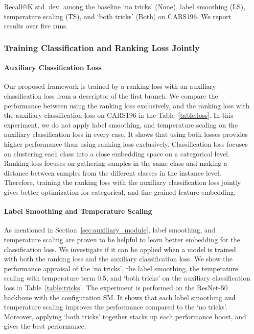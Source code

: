 \documentclass[10pt,twocolumn,letterpaper]{article}
\begin{document}
\begin{CJK}{UTF8}{mj}
\begin{table}[t!]
\begin{center}
\end{center}
\caption{Recall@K  std. dev. among the baseline `no tricks' (None), label smoothing (LS), temperature scaling (TS), and `both tricks' (Both) on CARS196.
We report results over five runs.}
\label{table:tricks}
\end{table}

\subsubsection{Training Classification and Ranking Loss Jointly}


\paragraph{Auxiliary Classification Loss} \label{sec:ranking_loss_and_classification_loss}
Our proposed framework is trained by a ranking loss with an auxiliary classification loss from a descriptor of the first branch.
We compare the performance between using the ranking loss exclusively, and the ranking loss with the auxiliary classification loss on CARS196 in the Table~\ref{table:loss}.
In this experiment, we do not apply label smoothing, and temperature scaling on the auxiliary classification loss in every case.
It shows that using both losses provides higher performance than using ranking loss exclusively.
Classification loss focuses on clustering each class into a close embedding space on a categorical level.
Ranking loss focuses on gathering samples in the same class and making a distance between samples from the different classes in the instance level.
Therefore, training the ranking loss with the auxiliary classification loss jointly gives better optimization for categorical, and fine-grained feature embedding.

\vspace{-4mm}
\paragraph{Label Smoothing and Temperature Scaling} \label{sec:label_smoothing_and_temperature_scaling}
As mentioned in Section~\ref{sec:auxiliary_module}, label smoothing, and temperature scaling are proven to be helpful to learn better embedding for the classification loss.
We investigate if it can be applied when a model is trained with both the ranking loss and the auxiliary classification loss.
We show the performance appraisal of the `no tricks', the label smoothing, the temperature scaling with temperature term 0.5, and `both tricks' on the auxiliary classification loss in Table~\ref{table:tricks}.
The experiment is performed on the ResNet-50~\cite{he2016deep} backbone with the configuration SM.
It shows that each label smoothing and temperature scaling improves the performance compared to the `no tricks'.
Moreover, applying `both tricks' together stacks up each performance boost, and gives the best performance.


\end{CJK}
\end{document}
